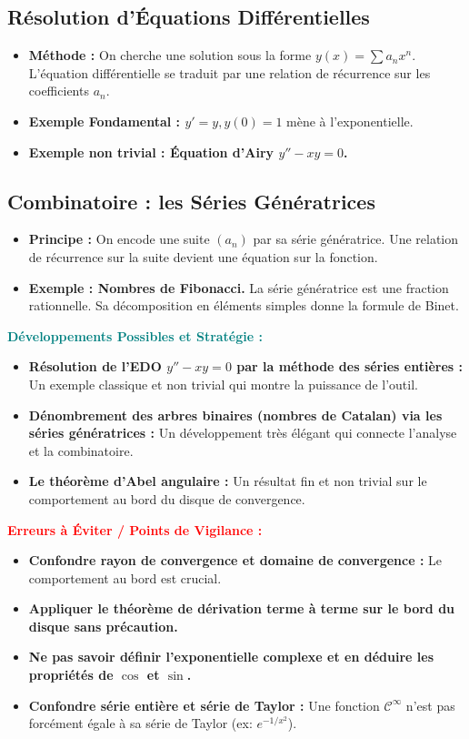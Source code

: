 \documentclass[12pt, a4paper, parskip=full]{report}
\theoremstyle{agregstyle}
\newenvironment{developpements}
  {\par\medskip\noindent\begin{oframed}\noindent\textbf{\textcolor{teal}{Développements Possibles et Stratégie :}}}
  {\end{oframed}\par\medskip}
\newenvironment{erreurs}
  {\par\medskip\noindent\begin{oframed}\noindent\textbf{\textcolor{red}{Erreurs à Éviter / Points de Vigilance :}}}
  {\end{oframed}\par\medskip}
\begin{document}
\subsection{Résolution d'Équations Différentielles}
\begin{itemize}
    \item \textbf{Méthode :} On cherche une solution sous la forme $y(x) = \sum a_n x^n$. L'équation différentielle se traduit par une relation de récurrence sur les coefficients $a_n$.
    \item \textbf{Exemple Fondamental : $y' = y, y(0)=1$} mène à l'exponentielle.
    \item \textbf{Exemple non trivial : Équation d'Airy $y'' - xy = 0$.}
\end{itemize}
\subsection{Combinatoire : les Séries Génératrices}
\begin{itemize}
    \item \textbf{Principe :} On encode une suite $(a_n)$ par sa série génératrice. Une relation de récurrence sur la suite devient une équation sur la fonction.
    \item \textbf{Exemple : Nombres de Fibonacci.} La série génératrice est une fraction rationnelle. Sa décomposition en éléments simples donne la formule de Binet.
\end{itemize}

\begin{developpements}
    \begin{itemize}
        \item \textbf{Résolution de l'EDO $y''-xy=0$ par la méthode des séries entières :} Un exemple classique et non trivial qui montre la puissance de l'outil.
        \item \textbf{Dénombrement des arbres binaires (nombres de Catalan) via les séries génératrices :} Un développement très élégant qui connecte l'analyse et la combinatoire.
        \item \textbf{Le théorème d'Abel angulaire :} Un résultat fin et non trivial sur le comportement au bord du disque de convergence.
    \end{itemize}
\end{developpements}

\begin{erreurs}
    \begin{itemize}
        \item \textbf{Confondre rayon de convergence et domaine de convergence :} Le comportement au bord est crucial.
        \item \textbf{Appliquer le théorème de dérivation terme à terme sur le bord du disque sans précaution.}
        \item \textbf{Ne pas savoir définir l'exponentielle complexe et en déduire les propriétés de $\cos$ et $\sin$.}
        \item \textbf{Confondre série entière et série de Taylor :} Une fonction $\mathcal{C}^\infty$ n'est pas forcément égale à sa série de Taylor (ex: $e^{-1/x^2}$).
    \end{itemize}
\end{erreurs}
\end{document}
